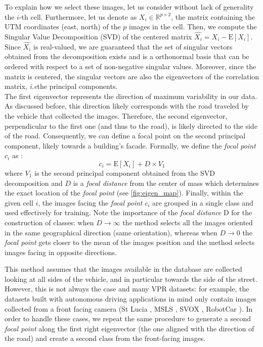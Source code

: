 \documentclass[10pt,twocolumn,letterpaper]{article}
\def\ie{\emph{i.e}\onedot}
\begin{document}
To explain how we select these images, let us consider without lack of generality the $i$-th cell. 
Furthermore, let us denote as $X_i \in \mathbb{R}^{p \times 2}$, the matrix containing the UTM coordinates (east, north) of the $p$ images in the cell. 
Then, we compute the Singular Value Decomposition (SVD)  of the centered matrix $\widehat{X_i} = X_i - \text{E}[X_i]$.
Since $\widehat{X_i}$ is real-valued, we are guaranteed that the set of singular vectors obtained from the decomposition exists and is a orthonormal basis that can be ordered with respect to a set of non-negative singular values. Moreover, since the matrix is centered, the singular vectors are also the eigenvectors of the correlation matrix, \ie the principal components.\\
The first eigenvector represents the direction of maximum variability in our data. As discussed before, this direction likely corresponds with the road traveled by the vehicle that collected the images.
Therefore, the second eigenvector, perpendicular to the first one (and thus to the road), is likely directed to the side of the road.
Consequently, we can define a focal point on the second principal component, likely towards a building's facade.
Formally, we define the \textit{focal point} $c_i$ as :
\begin{equation}
    c_i = \text{E}[X_i] + D \times V_1
    \label{eq:conv_point}
\end{equation}
where $V_1$ is the second principal component obtained from the SVD decomposition and $D$ is a \textit{focal distance} from the center of mass which determines the exact location of the \textit{focal point} (see \cref{fig:eigen_map}).
Finally, within the given cell $i$, the images facing the \textit{focal point} $c_i$ are grouped in a single class and used effectively for training.
Note the importance of the \textit{focal distance} D for the construction of classes: when $D \rightarrow \infty$ the method selects all the images oriented in the same geographical direction (same orientation), whereas when $D\rightarrow 0$ the \textit{focal point} gets closer to the mean of the images position and the method selects images facing in opposite directions.


This method assumes that the images available in the database are collected looking at all sides of the vehicle, and in particular towards the side of the street. However, this is not always the case and many VPR datasets: for example, the datasets built with autonomous driving applications in mind only contain images collected from a front facing camera (St Lucia \cite{Milford_2008_st_lucia}, MSLS \cite{Warburg_2020_msls}, SVOX \cite{Berton_2021_svox}, RobotCar \cite{Maddern_2017_robotCar}).
In order to handle these cases, we repeat the same procedure to generate a second \textit{focal point} along the first right eigenvector (the one aligned with the direction of the road) and create a second class from the front-facing images.
\end{document}
